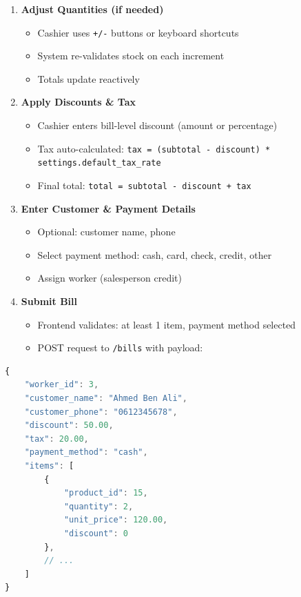 \begin{enumerate}[leftmargin=*]
    \item \textbf{Adjust Quantities (if needed)}
    \begin{itemize}
        \item Cashier uses \texttt{+/-} buttons or keyboard shortcuts
        \item System re-validates stock on each increment
        \item Totals update reactively
    \end{itemize}
    
    \item \textbf{Apply Discounts \& Tax}
    \begin{itemize}
        \item Cashier enters bill-level discount (amount or percentage)
        \item Tax auto-calculated: \texttt{tax = (subtotal - discount) * settings.default\_tax\_rate}
        \item Final total: \texttt{total = subtotal - discount + tax}
    \end{itemize}
    
    \item \textbf{Enter Customer \& Payment Details}
    \begin{itemize}
        \item Optional: customer name, phone
        \item Select payment method: cash, card, check, credit, other
        \item Assign worker (salesperson credit)
    \end{itemize}
    
    \item \textbf{Submit Bill}
    \begin{itemize}
        \item Frontend validates: at least 1 item, payment method selected
        \item POST request to \texttt{/bills} with payload:
    \end{itemize}
\end{enumerate}

\begin{lstlisting}[language=JavaScript,label=lst:bill-payload]
{
    "worker_id": 3,
    "customer_name": "Ahmed Ben Ali",
    "customer_phone": "0612345678",
    "discount": 50.00,
    "tax": 20.00,
    "payment_method": "cash",
    "items": [
        {
            "product_id": 15,
            "quantity": 2,
            "unit_price": 120.00,
            "discount": 0
        },
        // ...
    ]
}
\end{lstlisting}


